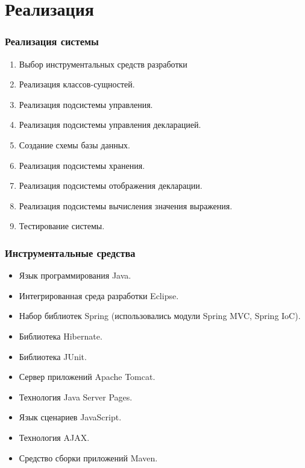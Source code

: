 \documentclass[xcolor=pdftex, dvipsnames, table]{beamer}
\begin{document}
\section{Реализация}
\begin{frame}
  \frametitle{Реализация системы}
  \begin{enumerate}
    \item Выбор инструментальных средств разработки
    \item Реализация классов-сущностей.
    \item Реализация подсистемы управления.
    \item Реализация подсистемы управления декларацией.
    \item Создание схемы базы данных.
    \item Реализация подсистемы хранения.
    \item Реализация подсистемы отображения декларации.
    \item Реализация подсистемы вычисления значения выражения.
    \item Тестирование системы.
  \end{enumerate}
\end{frame}
\begin{frame}
  \frametitle{Инструментальные средства}
  \begin{itemize}
    \item Язык программирования Java.
    \item Интегрированная среда разработки Eclipse.
    \item Набор библиотек Spring (использовались модули Spring MVC, Spring IoC).
    \item Библиотека Hibernate.
    \item Библиотека JUnit.
    \item Сервер приложений Apache Tomcat.
    \item Технология Java Server Pages.
    \item Язык сценариев JavaScript.
    \item Технология AJAX.
    \item Средство сборки приложений Maven.
  \end{itemize}
\end{frame}
\end{document}
